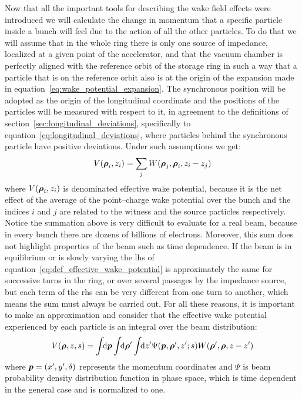     Now that all the important tools for describing the wake field effects were introduced we will calculate the change in momentum that a specific particle inside a bunch will feel due to the action of all the other particles. To do that we will assume that in the whole ring there is only one source of impedance, localized at a given point of the accelerator, and that the vacuum chamber is perfectly aligned with the reference orbit of the storage ring in such a way that a particle that is on the reference orbit also is at the origin of the expansion made in equation~\eqref{eq:wake_potential_expansion}. The synchronous position will be adopted as the origin of the longitudinal coordinate and the positions of the particles will be measured with respect to it, in agreement to the definitions of section~\ref{sec:longitudinal_deviations}, specifically to equation~\eqref{eq:longitudinal_deviations}, where particles behind the synchronous particle have positive deviations. Under such assumptions we get:
    \begin{align}\label{eq:def_effective_wake_potential}
  	    V(\boldsymbol{\rho}_i, z_i) = \sum_j W(\boldsymbol{\rho}_j,\boldsymbol{\rho}_i,z_i-z_j)
    \end{align}
    where $V(\boldsymbol{\rho}_i, z_i)$ is denominated effective wake potential, because it is the net effect of the average of the point--charge wake potential over the bunch and the indices $i$ and $j$ are related to the witness and the source particles respectively. Notice the summation above is very difficult to evaluate for a real beam, because in every bunch there are dozens of billions of electrons. Moreover, this sum does not highlight properties of the beam such as time dependence. If the beam is in equilibrium or is slowly varying the \gls{lhs} of equation~\eqref{eq:def_effective_wake_potential} is approximately the same for successive turns in the ring, or over several passages by the impedance source, but each term of the \gls{rhs} can be very different from one turn to another, which means the sum must always be carried out. For all these reasons, it is important to make an approximation and consider that the effective wake potential experienced by each particle is an integral over the beam distribution:
    \begin{align}\label{eq:int_effective_wake_potential}
  	  	V(\boldsymbol{\rho}, z, s) = \int\!\!\text{d}\boldsymbol{p} \int\!\!\text{d}\boldsymbol{\rho}' \int\!\!\text{d}z' 
	  			\Psi(\boldsymbol{p},\boldsymbol{\rho}',z'; s) W(\boldsymbol{\rho}',\boldsymbol{\rho},z-z')
    \end{align}
    where $\boldsymbol{p} = (x', y', \delta)$ represents the momentum coordinates and $\Psi$ is beam probability density distribution function in phase space, which is time dependent in the general case and is normalized to one.

